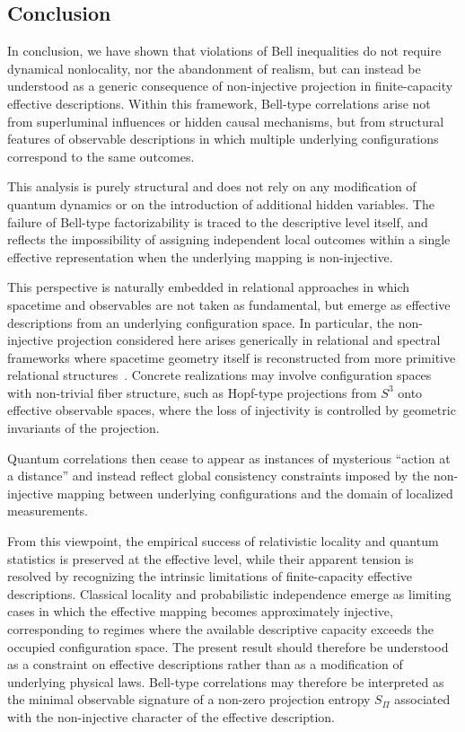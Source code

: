 \subsection{Conclusion}
  \label{subsec:conclusion}

  In conclusion, we have shown that violations of Bell inequalities do not require
  dynamical nonlocality, nor the abandonment of realism, but can instead be understood
  as a generic consequence of non-injective projection in finite-capacity effective
  descriptions.
  Within this framework, Bell-type correlations arise not from superluminal influences
  or hidden causal mechanisms, but from structural features of observable descriptions
  in which multiple underlying configurations correspond to the same outcomes.

  This analysis is purely structural and does not rely on any modification of quantum
  dynamics or on the introduction of additional hidden variables.
  The failure of Bell-type factorizability is traced to the descriptive level itself,
  and reflects the impossibility of assigning independent local outcomes within a
  single effective representation when the underlying mapping is non-injective.

  This perspective is naturally embedded in relational approaches in which spacetime
  and observables are not taken as fundamental, but emerge as effective descriptions
  from an underlying configuration space.
  In particular, the non-injective projection considered here arises generically in
  relational and spectral frameworks where spacetime geometry itself is reconstructed
  from more primitive relational structures~\cite{Beau2026a}.
  Concrete realizations may involve configuration spaces with non-trivial fiber
  structure, such as Hopf-type projections from $S^3$ onto effective observable
  spaces, where the loss of injectivity is controlled by geometric invariants of
  the projection.

  Quantum correlations then cease to appear as instances of mysterious ``action at a
  distance'' and instead reflect global consistency constraints imposed by the
  non-injective mapping between underlying configurations and the domain of localized
  measurements.

  From this viewpoint, the empirical success of relativistic locality and quantum
  statistics is preserved at the effective level, while their apparent tension is resolved
  by recognizing the intrinsic limitations of finite-capacity effective descriptions.
  Classical locality and probabilistic independence emerge as limiting cases in which
  the effective mapping becomes approximately injective, corresponding to regimes where
  the available descriptive capacity exceeds the occupied configuration space.
  The present result should therefore be understood as a constraint on effective
  descriptions rather than as a modification of underlying physical laws.
  Bell-type correlations may therefore be interpreted as the minimal observable
  signature of a non-zero projection entropy $S_{\Pi}$ associated with the
  non-injective character of the effective description.
